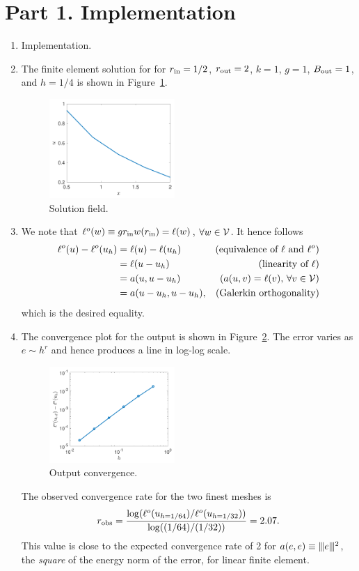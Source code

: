 \documentclass[preprint,11pt]{article}
\begin{document}
\section*{Part 1. Implementation}
\begin{enumerate}
\item Implementation.
\item The finite element solution for for $r_{\rm in} = 1/2$, $r_{\rm out} = 2$, $k = 1$, $g = 1$, $B_{\rm out} = 1$, and $h = 1/4$ is shown in Figure~\ref{fig:state}.
  \begin{figure}[!h]
    \centering
    \includegraphics[width=0.45\textwidth]{state}
    \caption{Solution field. \label{fig:state}}
  \end{figure}
\item We note that $\ell^o(w) \equiv gr_{\rm in} w(r_{\rm in}) = \ell(w)$, $\forall w \in \mathcal{V}$. It hence follows
  \begin{align*}
    \ell^o(u) - \ell^o(u_h)
    &= \ell(u) - \ell(u_h) & \text{(equivalence of $\ell$ and $\ell^o$)} \\
    &= \ell(u - u_h) & \text{(linearity of $\ell$)} \\
    &= a(u, u - u_h) & \text{($a(u,v) = \ell(v)$, $\forall v \in \mathcal{V}$)} \\
    &= a(u - u_h, u - u_h), & \text{(Galerkin orthogonality)}
  \end{align*}
  which is the desired equality.
\item
  The convergence plot for the output is shown in Figure~\ref{fig:conv}.  The error varies as $e \sim h^r$ and hence produces a line in log-log scale.
  \begin{figure}[!h]
    \centering
    \includegraphics[width=0.45\textwidth]{conv}
    \caption{Output convergence. \label{fig:conv}}
  \end{figure}
  The observed convergence rate for the two finest meshes is
  \begin{equation*}
    r_{\rm obs} = \frac{\log(\ell^o(u_{h = 1/64}) / \ell^o(u_{h = 1/32}))}{ \log( (1/64) / (1/32))} = 2.07.
  \end{equation*}
  This value is close to the expected convergence rate of 2 for $a(e,e) \equiv |\kern-1pt|\kern-1pt| e |\kern-1pt|\kern-1pt|^2$, the \emph{square} of the energy norm of the error, for linear finite element.
\end{enumerate}
\end{document}
